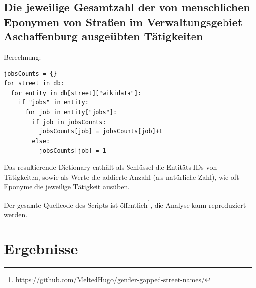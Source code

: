 \documentclass[ngerman,twocolumn,showpacs,%
  nofootinbib,aps,superscriptaddress,%
  eqsecnum,prd,notitlepage,showkeys,10pt,report]{revtex4-2}
\begin{document}
\subsection{Die jeweilige Gesamtzahl der von menschlichen Eponymen von Straßen
im Verwaltungsgebiet Aschaffenburg ausgeübten Tätigkeiten}
Berechnung:
\begin{lstlisting}
jobsCounts = {}
for street in db:
  for entity in db[street]["wikidata"]:
    if "jobs" in entity:
      for job in entity["jobs"]:
        if job in jobsCounts:
          jobsCounts[job] = jobsCounts[job]+1
        else:
          jobsCounts[job] = 1
\end{lstlisting}
Das resultierende Dictionary enthält als Schlüssel die Entitäts-IDs von Tätigkeiten, sowie als
Werte die addierte Anzahl (als natürliche Zahl), wie oft Eponyme die jeweilige Tätigkeit
ausüben.

Der gesamte Quellcode des Scripts ist öffentlich\footnote{\url{https://github.com/MeltedHugo/gender-gapped-street-names/}}, die Analyse kann reproduziert werden.

\newpage
\section{Ergebnisse}
\end{document}

